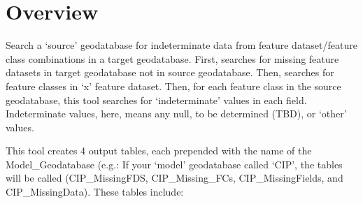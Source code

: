 \documentclass[openany]{book}
\theoremstyle{definition}
\theoremstyle{definition}
\theoremstyle{definition}
\theoremstyle{remark}
\begin{document}
\section{Overview}\label{overview-8}

Search a `source' geodatabase for indeterminate data from feature
dataset/feature class combinations in a target geodatabase. First,
searches for missing feature datasets in target geodatabase not in
source geodatabase. Then, searches for feature classes in `x' feature
dataset. Then, for each feature class in the source geodatabase, this
tool searches for `indeterminate' values in each field. Indeterminate
values, here, means any null, to be determined (TBD), or `other' values.

This tool creates 4 output tables, each prepended with the name of the
Model\_Geodatabase (e.g.: If your `model' geodatabase called `CIP', the
tables will be called (CIP\_MissingFDS, CIP\_Missing\_FCs,
CIP\_MissingFields, and CIP\_MissingData). These tables include:
\end{document}
